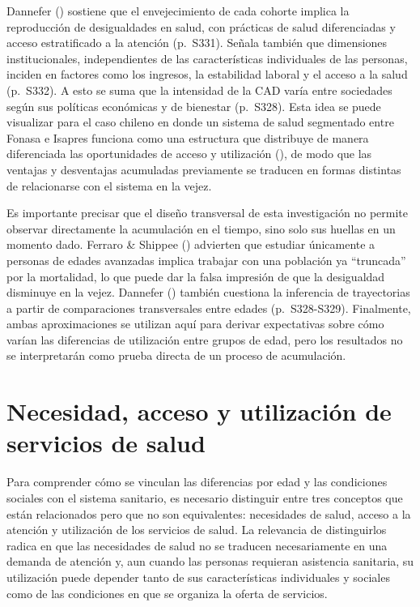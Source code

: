 \documentclass[
  spanish,
  a4paper,
  oneside]{scrbook}
\begin{document}
Dannefer () sostiene que el
envejecimiento de cada cohorte implica la reproducción de desigualdades
en salud, con prácticas de salud diferenciadas y acceso estratificado a
la atención (p.~S331). Señala también que dimensiones institucionales,
independientes de las características individuales de las personas,
inciden en factores como los ingresos, la estabilidad laboral y el
acceso a la salud (p.~S332). A esto se suma que la intensidad de la CAD
varía entre sociedades según sus políticas económicas y de bienestar
(p.~S328). Esta idea se puede visualizar para el caso chileno en donde
un sistema de salud segmentado entre Fonasa e Isapres funciona como una
estructura que distribuye de manera diferenciada las oportunidades de
acceso y utilización
(), de modo que las ventajas y desventajas acumuladas previamente se
traducen en formas distintas de relacionarse con el sistema en la vejez.

Es importante precisar que el diseño transversal de esta investigación
no permite observar directamente la acumulación en el tiempo, sino solo
sus huellas en un momento dado. Ferraro \& Shippee
() advierten que estudiar
únicamente a personas de edades avanzadas implica trabajar con una
población ya ``truncada'' por la mortalidad, lo que puede dar la falsa
impresión de que la desigualdad disminuye en la vejez. Dannefer
() también cuestiona la
inferencia de trayectorias a partir de comparaciones transversales entre
edades (p.~S328-S329). Finalmente, ambas aproximaciones se utilizan aquí
para derivar expectativas sobre cómo varían las diferencias de
utilización entre grupos de edad, pero los resultados no se
interpretarán como prueba directa de un proceso de acumulación.

\section{Necesidad, acceso y utilización de servicios de
salud}\label{necesidad-acceso-y-utilizaciuxf3n-de-servicios-de-salud}

Para comprender cómo se vinculan las diferencias por edad y las
condiciones sociales con el sistema sanitario, es necesario distinguir
entre tres conceptos que están relacionados pero que no son
equivalentes: necesidades de salud, acceso a la atención y utilización
de los servicios de salud. La relevancia de distinguirlos radica en que
las necesidades de salud no se traducen necesariamente en una demanda de
atención y, aun cuando las personas requieran asistencia sanitaria, su
utilización puede depender tanto de sus características individuales y
sociales como de las condiciones en que se organiza la oferta de
servicios.
\end{document}
